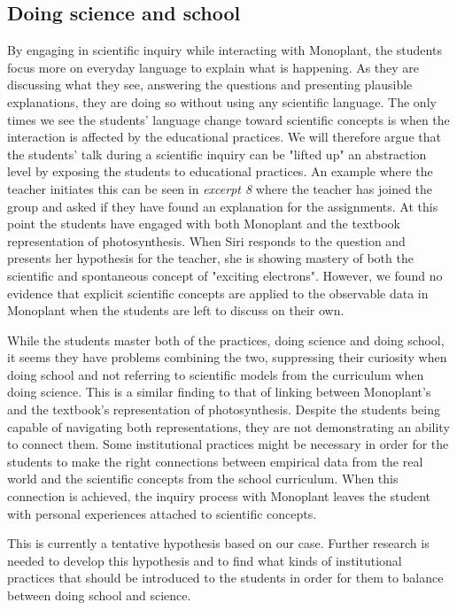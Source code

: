 \subsection{Doing science and school}
By engaging in scientific inquiry while interacting with Monoplant, the students focus more on everyday language to explain what is happening. As they are discussing what they see, answering the questions and presenting plausible explanations, they are doing so without using any scientific language. The only times we see the students' language change toward scientific concepts is when the interaction is affected by the educational practices. We will therefore argue that the students' talk during a scientific inquiry can be "lifted up" an abstraction level by exposing the students to educational practices. An example where the teacher initiates this can be seen in \emph{excerpt 8} where the teacher has joined the group and asked if they have found an explanation for the assignments. At this point the students have engaged with both Monoplant and the textbook representation of photosynthesis. When Siri responds to the question and presents her hypothesis for the teacher, she is showing mastery of both the scientific and spontaneous concept of "exciting electrons". However, we found no evidence that explicit scientific concepts are applied to the observable data in Monoplant when the students are left to discuss on their own. 

While the students master both of the practices, doing science and doing school, it seems they have problems combining the two, suppressing their curiosity when doing school and not referring to scientific models from the curriculum when doing science. This is a similar finding to that of linking between Monoplant's and the textbook's representation of photosynthesis. Despite the students being capable of navigating both representations, they are not demonstrating an ability to connect them. Some institutional practices might be necessary in order for the students to make the right connections between empirical data from the real world and the scientific concepts from the school curriculum. When this connection is achieved, the inquiry process with Monoplant leaves the student with personal experiences attached to scientific concepts. 

This is currently a tentative hypothesis based on our case. Further research is needed to develop this hypothesis and to find what kinds of institutional practices that should be introduced to the students in order for them to balance between doing school and science.



